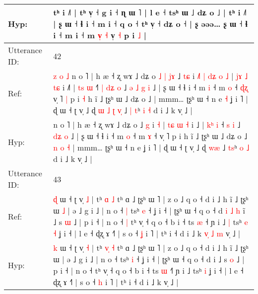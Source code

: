 \documentclass[10pt]{article}
\DeclareRobustCommand{\hl}[1]{{\textcolor{red}{#1}}}
\begin{document}
\begin{longtable}{ll}
 \\
Hyp: & tʰ i ˩˥ | tʰ v̩ ˧ g i ˧ ɳ ɯ ˥ | l e ˧ tsʰ ɯ ˩ dʑ o ˩ | tʰ i ˩˥ |\hl{}\hl{}\hl{}\hl{}\hl{} ʂ ɯ ˧ ɬ i ˧ m i ˧ q o ˧ tʰ v̩ ˧ dʑ o ˧ | ʂ əəə… ʂ ɯ ˧ ɬ i ˧ m i ˧\hl{}\hl{} m \hl{}\hl{v}\hl{̩} \hl{}\hl{˧} v̩\hl{}\hl{} \hl{˧} p i \hl{˩} |
 \\
\midrule
Utterance ID: & 42 \\
Ref: & \hl{z}\hl{ }\hl{o}\hl{ }\hl{˩}\hl{ }n o ˥ | h æ ˧ ʐ wɤ ˩ dʑ o\hl{ }\hl{˩}\hl{ }\hl{|}\hl{ }\hl{j}\hl{ɤ} ˩ \hl{t}\hl{ɕ} i\hl{ }\hl{˩}\hl{˥}\hl{ }\hl{|}\hl{ }\hl{d}\hl{ʑ}\hl{ }\hl{o} \hl{˩} | \hl{j}\hl{ɤ} \hl{˩} \hl{t}\hl{ɕ} i ˩\hl{˥} | \hl{t}\hl{s} \hl{ɯ} ˧\hl{˥}\hl{ }\hl{|} \hl{d}\hl{ʑ} \hl{o} ˩\hl{ }\hl{ə} \hl{˩}\hl{ }\hl{g} \hl{i} ˩ | ʂ ɯ ˧ ɬ i ˧ m \hl{i} ˧ m \hl{o} ˧\hl{ }\hl{ɖ}\hl{ʐ} v̩ ˥\hl{ }\hl{|} p i\hl{ }\hl{˧} h ĩ ˩ ʈʂʰ ɯ ˩ dʑ o ˩\hl{}\hl{}\hl{}\hl{}\hl{}\hl{} | mmm… ʈʂʰ ɯ ˧ n e\hl{ }\hl{˧} ʝ i ˥ | ɖ ɯ ˧ ʈ v̩ ˩ ɖ\hl{ }\hl{ɯ}\hl{ }\hl{˩}\hl{ }\hl{ʈ} \hl{v}\hl{̩} ˩ \hl{|}\hl{ }\hl{t}ʰ \hl{i} \hl{˧} d i ˩ k v̩ ˩ |
 \\
Hyp: & \hl{}\hl{}\hl{}\hl{}\hl{}\hl{}n o ˥ | h æ ˧ ʐ wɤ ˩ dʑ o\hl{}\hl{}\hl{}\hl{}\hl{}\hl{}\hl{} ˩ \hl{}\hl{g} i\hl{}\hl{}\hl{}\hl{}\hl{}\hl{}\hl{}\hl{}\hl{}\hl{} \hl{˧} | \hl{t}\hl{ɕ} \hl{ɯ} \hl{}\hl{˧} i ˩\hl{} | \hl{k}\hl{ʰ} \hl{i} ˧\hl{}\hl{}\hl{} \hl{}\hl{s} \hl{i} ˩\hl{}\hl{} \hl{}\hl{d}\hl{ʑ} \hl{o} ˩ | ʂ ɯ ˧ ɬ i ˧ m \hl{o} ˧ m \hl{ɤ} ˧\hl{}\hl{}\hl{} v̩ ˥\hl{}\hl{} p i\hl{}\hl{} h ĩ ˩ ʈʂʰ ɯ ˩ dʑ o ˩\hl{ }\hl{n}\hl{ }\hl{o}\hl{ }\hl{˧} | mmm… ʈʂʰ ɯ ˧ n e\hl{}\hl{} ʝ i ˥ | ɖ ɯ ˧ ʈ v̩ ˩ ɖ\hl{}\hl{}\hl{}\hl{}\hl{}\hl{} \hl{w}\hl{æ} ˩ \hl{}\hl{t}\hl{s}ʰ \hl{o} \hl{˩} d i ˩ k v̩ ˩ |
 \\
\midrule
Utterance ID: & 43 \\
Ref: & \hl{ɖ} ɯ ˧ ʈ v̩ \hl{˩} | tʰ \hl{}\hl{ɑ} \hl{˩} tʰ ɑ ˩ ʈʂʰ ɯ ˥ | z o ˩ q o ˧ d i ˩ h ĩ ˩ ʈʂʰ ɯ\hl{ }\hl{˩} | ə ˩ g i ˩ | n o ˧\hl{ }\hl{|} tsʰ \hl{e} ˧ ʝ i ˧ | ʈʂʰ ɯ ˧ q o ˧ d\hl{ }\hl{i}\hl{ }\hl{˩}\hl{ }\hl{h} i\hl{̃} ˩ s \hl{ɯ} ˩ | p i ˧ | n o ˧\hl{ }\hl{|} tʰ v̩ ˧ q o ˧ b i ˧ ts \hl{æ} ˧\hl{} ɲ i ˩\hl{ }\hl{|} tsʰ\hl{ }\hl{e} \hl{˧} ʝ i ˧ | l e ˧ ɖʐ ɤ ˧˥ | s o ˧ \hl{ʝ} i ˥ | tʰ i ˧ d i ˩ k\hl{ }\hl{v}\hl{̩}\hl{ }\hl{˩}\hl{ }\hl{m} v̩ ˩ |
 \\
Hyp: & \hl{k} ɯ ˧ ʈ v̩ \hl{˧} | tʰ \hl{v}\hl{̩} \hl{˧} tʰ ɑ ˩ ʈʂʰ ɯ ˥ | z o ˩ q o ˧ d i ˩ h ĩ ˩ ʈʂʰ ɯ\hl{}\hl{} | ə ˩ g i ˩ | n o ˧\hl{}\hl{} tsʰ \hl{i} ˧ ʝ i ˧ | ʈʂʰ ɯ ˧ q o ˧ d\hl{}\hl{}\hl{}\hl{}\hl{}\hl{} i\hl{} ˩ s \hl{o} ˩ | p i ˧ | n o ˧\hl{}\hl{} tʰ v̩ ˧ q o ˧ b i ˧ ts \hl{ɯ} ˧\hl{˥} ɲ i ˩\hl{}\hl{} tsʰ\hl{}\hl{} \hl{i} ʝ i ˧ | l e ˧ ɖʐ ɤ ˧˥ | s o ˧ \hl{h} i ˥ | tʰ i ˧ d i ˩ k\hl{}\hl{}\hl{}\hl{}\hl{}\hl{}\hl{} v̩ ˩ |

\end{longtable}
\end{document}
